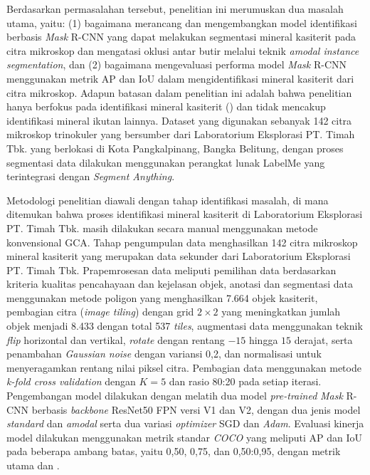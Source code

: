 \begin{center}
	Berdasarkan permasalahan tersebut, penelitian ini merumuskan dua masalah utama, yaitu: (1) bagaimana merancang dan mengembangkan model identifikasi berbasis \textit{Mask} R-CNN yang dapat melakukan segmentasi mineral kasiterit pada citra mikroskop dan mengatasi oklusi antar butir melalui teknik \textit{amodal instance segmentation}, dan (2) bagaimana mengevaluasi performa model \textit{Mask} R-CNN menggunakan metrik AP dan IoU dalam mengidentifikasi mineral kasiterit dari citra mikroskop. Adapun batasan dalam penelitian ini adalah bahwa penelitian hanya berfokus pada identifikasi mineral kasiterit (\senyawatin) dan tidak mencakup identifikasi mineral ikutan lainnya. Dataset yang digunakan sebanyak 142 citra mikroskop trinokuler yang bersumber dari Laboratorium Eksplorasi PT. Timah Tbk. yang berlokasi di Kota Pangkalpinang, Bangka Belitung, dengan proses segmentasi data dilakukan menggunakan perangkat lunak LabelMe yang terintegrasi dengan \textit{Segment Anything}. \par
	

	Metodologi penelitian diawali dengan tahap identifikasi masalah, di mana ditemukan bahwa proses identifikasi mineral kasiterit di Laboratorium Eksplorasi PT. Timah Tbk. masih dilakukan secara manual menggunakan metode konvensional GCA. Tahap pengumpulan data menghasilkan 142 citra mikroskop mineral kasiterit yang merupakan data sekunder dari Laboratorium Eksplorasi PT. Timah Tbk. Prapemrosesan data meliputi pemilihan data berdasarkan kriteria kualitas pencahayaan dan kejelasan objek, anotasi dan segmentasi data menggunakan metode poligon yang menghasilkan 7.664 objek kasiterit, pembagian citra (\textit{image tiling}) dengan grid $2 \times 2$ yang meningkatkan jumlah objek menjadi 8.433 dengan total 537 \textit{tiles}, augmentasi data menggunakan teknik \textit{flip} horizontal dan vertikal, \textit{rotate} dengan rentang $-15$ hingga $15$ derajat, serta penambahan \textit{Gaussian noise} dengan variansi 0{,}2, dan normalisasi untuk menyeragamkan rentang nilai piksel citra. Pembagian data menggunakan metode \textit{k-fold cross validation} dengan $K=5$ dan rasio 80:20 pada setiap iterasi. Pengembangan model dilakukan dengan melatih dua model \textit{pre-trained} \textit{Mask} R-CNN berbasis \textit{backbone} ResNet50 FPN versi V1 dan V2, dengan dua jenis model \textit{standard} dan \textit{amodal} serta dua variasi \textit{optimizer} SGD dan \textit{Adam}. Evaluasi kinerja model dilakukan menggunakan metrik standar \textit{COCO} yang meliputi AP dan IoU pada beberapa ambang batas, yaitu 0{,}50, 0{,}75, dan 0{,}50:0{,}95, dengan metrik utama \APrangefiftyy dan \IoUrangefiftyy. \par


\end{center}
